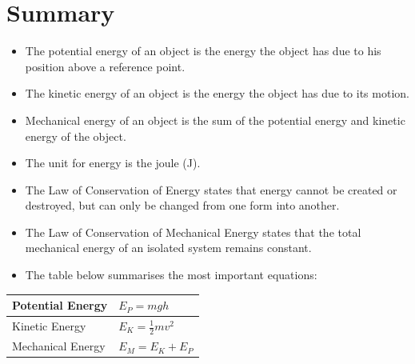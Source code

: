             \section*{Summary}
            \nopagebreak
      \label{m38786*id70947}\begin{itemize}[noitemsep]
            \label{m38786*uid111}\item The potential energy of an object is the energy the object has due to his position above a reference point.
\label{m38786*uid112}\item The kinetic energy of an object is the energy the object has due to its motion.
\label{m38786*uid113}\item Mechanical energy of an object is the sum of the potential energy and kinetic energy of the object.
\label{m38786*uid114}\item The unit for energy is the joule (J).
\label{m38786*uid115}\item The Law of Conservation of Energy states that energy cannot be created or destroyed, but can only be changed from one form into another.
\label{m38786*uid116}\item The Law of Conservation of Mechanical Energy states that the total mechanical energy of an isolated system remains constant.
\label{m38786*uid117}\item The table below summarises the most important equations:
\end{itemize}
          \begin{table}[H]
        \begin{center}
      \label{m38786*id71092}
    \noindent
      \begin{tabular}{|l|l|}\hline
        Potential Energy &
                ${E}_{P}=mgh$
             \\ \hline
        Kinetic Energy &
                ${E}_{K}=\frac{1}{2}m{v}^{2}$
              \\ \hline
        Mechanical Energy &
                ${E}_{M}={E}_{K}+{E}_{P}$
            \\ \hline
    \end{tabular}
      \end{center}
\end{table}
    \par
    \label{m38786*cid9}

